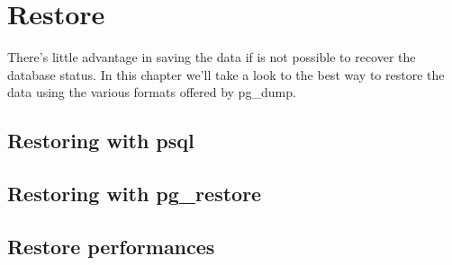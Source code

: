 \chapter{Restore}
\label{cha:RESTORE}
There's little advantage in saving the data if is not possible to recover the database status. 
In this chapter we'll take a look to the best way to restore the data using the various formats 
offered by pg\_dump. 

\section{Restoring with psql}

\section{Restoring with pg\_restore}

\section{Restore performances}



